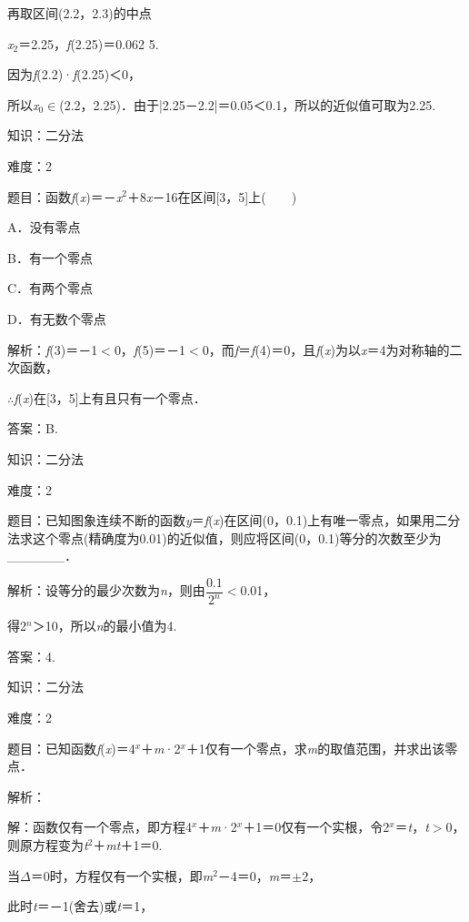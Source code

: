 \documentclass{article} %
\begin{document}
再取区间(2.2，2.3)的中点

\textit{x}${}_{2}$＝2.25，\textit{f}(2.25)＝0.062 5.

因为\textit{f}(2.2)·\textit{f}(2.25)＜0，

所以\textit{x}${}_{0}$$\mathrm{\in}$(2.2，2.25)．由于|2.25－2.2|＝0.05＜0.1，所以的近似值可取为2.25.

知识：二分法

难度：2

题目：函数\textit{f}(\textit{x})＝－\textit{x}${}^{2}$＋8\textit{x}－16在区间[3，5]上(　　)

A．没有零点　　　　　 

B．有一个零点

C．有两个零点   

D．有无数个零点

解析：\textit{f}(3)＝－1$\mathrm{<}$0，\textit{f}(5)＝－1$\mathrm{<}$0，而\textit{f}＝\textit{f}(4)＝0，且\textit{f}(\textit{x})为以\textit{x}＝4为对称轴的二次函数，

$\mathrm{\therefore}$\textit{f}(\textit{x})在[3，5]上有且只有一个零点．

答案：B.

知识：二分法

难度：2

题目：已知图象连续不断的函数\textit{y}＝\textit{f}(\textit{x})在区间(0，0.1)上有唯一零点，如果用二分法求这个零点(精确度为0.01)的近似值，则应将区间(0，0.1)等分的次数至少为\_\_\_\_\_\_．

解析：设等分的最少次数为\textit{n}，则由$\dfrac{0.1}{2^{n}}$$\mathrm{<}$0.01，

得2\textit{${}^{n}$}＞10，所以\textit{n}的最小值为4.

答案：4.

知识：二分法

难度：2

题目：已知函数\textit{f}(\textit{x})＝4\textit{${}^{x}$}＋\textit{m}·2\textit{${}^{x}$}＋1仅有一个零点，求\textit{m}的取值范围，并求出该零点．

解析：

解：函数仅有一个零点，即方程4\textit{${}^{x}$}＋\textit{m}·2\textit{${}^{x}$}＋1＝0仅有一个实根，令2\textit{${}^{x}$}＝\textit{t}，\textit{t}$\mathrm{>}$0，则原方程变为\textit{t}${}^{2}$＋\textit{mt}＋1＝0.

当$\Delta$＝0时，方程仅有一个实根，即\textit{m}${}^{2}$－4＝0，\textit{m}＝$\mathrm{\pm}$2，

此时\textit{t}＝－1(舍去)或\textit{t}＝1，
\end{document}
